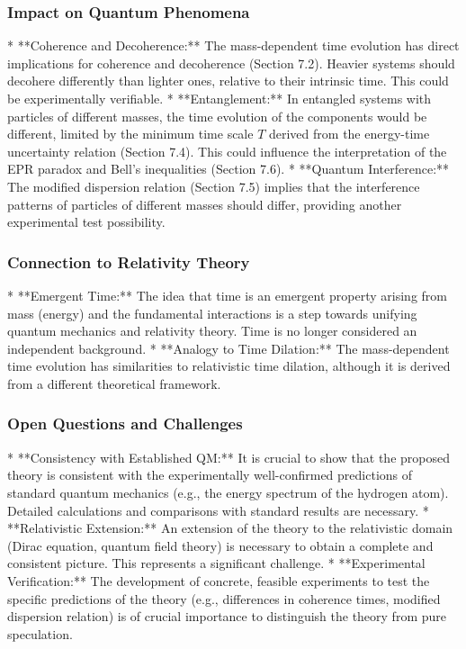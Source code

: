 \documentclass{article}
\begin{document}
	\subsubsection{Impact on Quantum Phenomena}
	
	*   **Coherence and Decoherence:** The mass-dependent time evolution has direct implications for coherence and decoherence (Section 7.2). Heavier systems should decohere differently than lighter ones, relative to their intrinsic time. This could be experimentally verifiable.
	*   **Entanglement:** In entangled systems with particles of different masses, the time evolution of the components would be different, limited by the minimum time scale $T$ derived from the energy-time uncertainty relation (Section 7.4). This could influence the interpretation of the EPR paradox and Bell's inequalities (Section 7.6).
	*   **Quantum Interference:** The modified dispersion relation (Section 7.5) implies that the interference patterns of particles of different masses should differ, providing another experimental test possibility.
	
	\subsubsection{Connection to Relativity Theory}
	
	*   **Emergent Time:** The idea that time is an emergent property arising from mass (energy) and the fundamental interactions is a step towards unifying quantum mechanics and relativity theory. Time is no longer considered an independent background.
	*   **Analogy to Time Dilation:** The mass-dependent time evolution has similarities to relativistic time dilation, although it is derived from a different theoretical framework.
	
	\subsubsection{Open Questions and Challenges}
	
	*   **Consistency with Established QM:** It is crucial to show that the proposed theory is consistent with the experimentally well-confirmed predictions of standard quantum mechanics (e.g., the energy spectrum of the hydrogen atom). Detailed calculations and comparisons with standard results are necessary.
	*   **Relativistic Extension:** An extension of the theory to the relativistic domain (Dirac equation, quantum field theory) is necessary to obtain a complete and consistent picture. This represents a significant challenge.
	*   **Experimental Verification:** The development of concrete, feasible experiments to test the specific predictions of the theory (e.g., differences in coherence times, modified dispersion relation) is of crucial importance to distinguish the theory from pure speculation.
	
\end{document}

